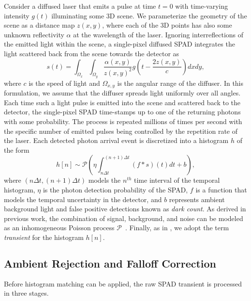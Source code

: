 Consider a diffused laser that emits a pulse at time $t = 0$ with time-varying
intensity $g(t)$ illuminating some 3D scene. We parameterize the geometry of the
scene as a distance map $z(x, y)$, where each of the 3D points has also some
unknown reflectivity $\alpha$ at the wavelength of the laser. Ignoring
interreflections of the emitted light within the scene, a single-pixel diffused
SPAD integrates the light scattered back from the scene towards the
detector as
%
\begin{equation}
	s \left( t \right)= \int_{\Omega_x} \int_{\Omega_y} \frac{\alpha \left( x,y \right)}{z(x,y)^2}  g \left( t - \frac{2z(x,y)}{c} \right) dx dy ,
	\label{eq:pulse_integral} 
\end{equation}  
%
where $c$ is the speed of light and $\Omega_{x,y}$ is the angular range of the
diffuser. In this formulation, we assume that the diffuser spreads light
uniformly over all angles. Each time such a light pulse is emitted into the
scene and scattered back to the detector,
the single-pixel SPAD time-stamps up to one of the returning photons with some
probability. The process is
repeated millions of times per second with the specific number of emitted pulses
being controlled by the repetition rate of the laser.
Each detected
photon arrival event is discretized into a histogram $h$ of the form
%
\begin{equation}
  h[n] \sim \mathcal{P} \left( \eta \int_{n\Delta t}^{(n+1)\Delta t} \left(f * s \right) \left( t \right)  dt + b \right),	
	\label{eq:spad_measurements}
\end{equation}
%
where $(n\Delta t, (n+1) \Delta t)$ models the $n^{th}$ time interval of the
temporal histogram, $\eta$ is the photon detection probability of the SPAD, $f$
is a function that models the temporal uncertainty in the detector, and $b$
represents ambient background light and false positive detections known as \textit{dark
count}. As derived in previous work, the combination of signal, background, and
noise can be modeled as an inhomogeneous Poisson process
$\mathcal{P}$~\cite{Kirmani:2014,Shin2015}. Finally, as in \cite{Xin2019}, we adopt the term
\textit{transient} for the histogram $h[n]$.

\subsection{Ambient Rejection and Falloff Correction}
Before histogram matching can be applied, the raw SPAD transient is processed in
three stages.

